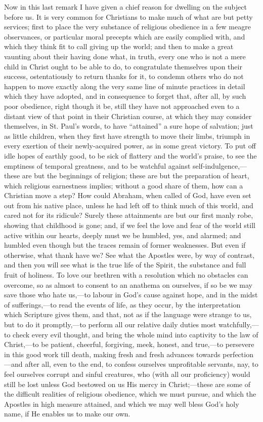 Now in this last remark I have given a chief reason for dwelling on the subject before us. It is very common
for Christians to make much of what are but petty
services; first to place the very substance of religious
obedience in a few meagre observances, or particular
moral precepts which are easily complied with, and which
they think fit to call giving up the world; and then to
make a great vaunting about their having done what, in
truth, every one who is not a mere child in Christ ought
to be able to do, to congratulate themselves upon their
success, ostentatiously to return thanks for it, to
condemn others who do not happen to move exactly along
the very same line of minute practices in detail which
they have adopted, and in consequence to forget that,
after all, by such poor obedience, right though it be,
still they have not approached even to a distant view of
that point in their Christian course, at which they may
consider themselves, in St. Paul's words, to have
``attained'' a sure hope of salvation; just as
little children, when they first have strength to move
their limbs, triumph in every exertion of their
newly-acquired power, as in some great victory. To put
off idle hopes of earthly good, to be sick of flattery
and the world's praise, to see the emptiness of temporal
greatness, and to be watchful against
self-indulgence,—these are but the beginnings of
religion; these are but the preparation of heart, which
religious earnestness implies; without a good share of
them, how can a Christian move a step? How could Abraham,
when called of God, have even set out from his native
place, unless he had left off to think much of this
world, and cared not for its ridicule? Surely these
attainments are but our first manly robe, showing that
childhood is gone; and, if we feel the love and fear of
the world still active within our hearts, deeply must we
be humbled, yes, and alarmed; and humbled even though but
the traces remain of former weaknesses. But even if
otherwise, what thank have we? See what the Apostles
were, by way of contrast, and then you will see what is
the true life of the Spirit, the substance and full fruit
of holiness. To love our brethren with a resolution which
no obstacles can overcome, so as almost to consent to an
anathema on ourselves, if so be we may save those who
hate us,—to labour in God's cause against hope, and
in the midst of sufferings,—to read the events of
life, as they occur, by the interpretation which
Scripture gives them, and that, not as if the language
were strange to us, but to do it promptly,—to
perform all our relative daily duties most
watchfully,—to check every evil thought, and bring
the whole mind into captivity to the law of
Christ,—to be patient, cheerful, forgiving, meek,
honest, and true,—to persevere in this good work
till death, making fresh and fresh advances towards
perfection—and after all, even to the end, to
confess ourselves unprofitable servants, nay, to feel
ourselves corrupt and sinful creatures, who (with all our
proficiency) would still be lost unless God bestowed on
us His mercy in Christ;—these are some of the
difficult realities of religious obedience, which we must
pursue, and which the Apostles in high measure attained,
and which we may well bless God's holy name, if He
enables us to make our own.

